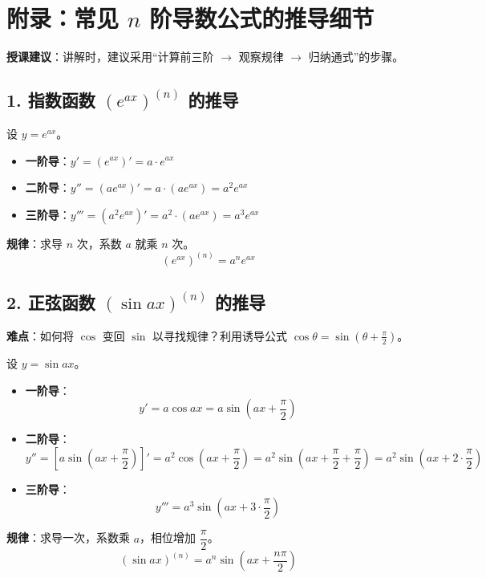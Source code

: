 \documentclass[12pt,a4paper]{article}
\begin{document}
\section*{附录：常见 $n$ 阶导数公式的推导细节}

\textbf{授课建议}：讲解时，建议采用“计算前三阶 $\to$ 观察规律 $\to$ 归纳通式”的步骤。

\vspace{1em}

\subsection*{1. 指数函数 $(e^{ax})^{(n)}$ 的推导}

\begin{derivebox}
设 $y = e^{ax}$。
\begin{itemize}
    \item \textbf{一阶导}：$y' = (e^{ax})' = a \cdot e^{ax}$
    \item \textbf{二阶导}：$y'' = (a e^{ax})' = a \cdot (a e^{ax}) = a^2 e^{ax}$
    \item \textbf{三阶导}：$y''' = (a^2 e^{ax})' = a^2 \cdot (a e^{ax}) = a^3 e^{ax}$
\end{itemize}
\textbf{规律}：求导 $n$ 次，系数 $a$ 就乘 $n$ 次。
\[
\boxed{(e^{ax})^{(n)} = a^n e^{ax}}
\]
\end{derivebox}

\newpage
\subsection*{2. 正弦函数 $(\sin ax)^{(n)}$ 的推导}
\textbf{难点}：如何将 $\cos$ 变回 $\sin$ 以寻找规律？利用诱导公式 $\cos \theta = \sin(\theta + \frac{\pi}{2})$。

\begin{derivebox}
设 $y = \sin ax$。
\begin{itemize}
    \item \textbf{一阶导}：
    \[ y' = a \cos ax = a \sin\left(ax + \dfrac{\pi}{2}\right) \]
    
    \item \textbf{二阶导}：
    \[ y'' = \left[ a \sin\left(ax + \dfrac{\pi}{2}\right) \right]' = a^2 \cos\left(ax + \dfrac{\pi}{2}\right) = a^2 \sin\left(ax + \dfrac{\pi}{2} + \dfrac{\pi}{2}\right) = a^2 \sin\left(ax + 2 \cdot \dfrac{\pi}{2}\right) \]
    
    \item \textbf{三阶导}：
    \[ y''' = a^3 \sin\left(ax + 3 \cdot \dfrac{\pi}{2}\right) \]
\end{itemize}
\textbf{规律}：求导一次，系数乘 $a$，相位增加 $\dfrac{\pi}{2}$。
\[
\boxed{(\sin ax)^{(n)} = a^n \sin\left(ax + \dfrac{n\pi}{2}\right)}
\]
\end{derivebox}
\end{document}
